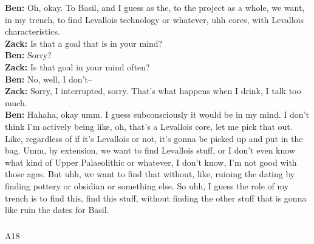 \documentclass[
]{article}
\makeatletter
\let\oldsubparagraph\subparagraph
\renewcommand{\subparagraph}{
    \@ifstar
      \xxxSubParagraphStar
      \xxxSubParagraphNoStar
  }
\newcommand{\xxxSubParagraphStar}[1]{\oldsubparagraph*{#1}\mbox{}}
\newcommand{\xxxSubParagraphNoStar}[1]{\oldsubparagraph{#1}\mbox{}}
\makeatother
\begin{document}
\textbf{Ben:} Oh, okay. To Basil, and I guess as the, to the project as
a whole, we want, in my trench, to find Levallois technology or
whatever, uhh cores, with Levallois characteristics.\\
\textbf{Zack:} Is that a goal that is in your mind?\\
\textbf{Ben:} Sorry?\\
\textbf{Zack:} Is that goal in your mind often?\\
\textbf{Ben:} No, well, I don't--\\
\textbf{Zack:} Sorry, I interrupted, sorry. That's what happens when I
drink, I talk too much.\\
\textbf{Ben:} Hahaha, okay umm. I guess subconsciously it would be in my
mind. I don't think I'm actively being like, oh, that's a Levallois
core, let me pick that out. Like, regardless of if it's Levallois or
not, it's gonna be picked up and put in the bag. Umm, by extension, we
want to find Levallois stuff, or I don't even know what kind of Upper
Palaeolithic or whatever, I don't know, I'm not good with those ages.
But uhh, we want to find that without, like, ruining the dating by
finding pottery or obsidian or something else. So uhh, I guess the role
of my trench is to find this, find this stuff, without finding the other
stuff that is gonna like ruin the dates for Basil.

\subparagraph{A18}\label{sec-A18}
\end{document}
